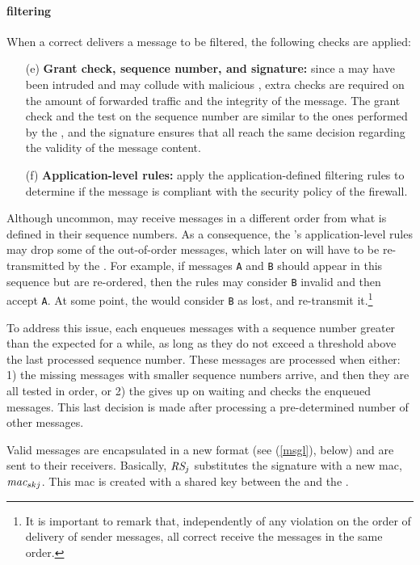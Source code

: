 \paragraph{\Repsieve filtering}
When a correct \repsieve delivers a message to be filtered, the following checks are applied:

\begin{enumerate}
\item[(e)] \textbf{Grant check, sequence number, and signature:} since a \presieve may have been intruded and may collude with malicious \sender, extra checks are required on the amount of forwarded traffic and the integrity of the message.
The grant check and the test on the sequence number are similar to the ones performed by the \presieve, and the signature ensures that all \repsieves reach the same decision regarding the validity of the message content.
\item[(f)] \textbf{Application-level rules:} apply the application-defined filtering rules to determine if the message is compliant with the security policy of the firewall.
\end{enumerate}

Although uncommon, \repsieves may receive messages in a different order from what is defined in their sequence numbers.
As a consequence, the \repsieve's application-level rules may drop some of the out-of-order messages, which later on will have to be re-transmitted by the \sender.
For example, if messages \texttt{A} and \texttt{B} should appear in this sequence but are re-ordered, then the rules may consider \texttt{B} invalid and then accept \texttt{A}.
At some point, the \sender would consider \texttt{B} as lost, and re-transmit it.\footnote{It is important to remark that, independently of any violation on the order of delivery of sender messages, all correct \repsieves receive the messages in the same order.}

To address this issue, each \repsieve enqueues messages with a sequence number greater than the expected for a while, as long as they do not exceed a threshold above the last processed sequence number. These messages are processed when either: 1) the missing messages with smaller sequence numbers arrive, and then they are all tested in order, or 2) the \repsieve gives up on waiting and checks the enqueued messages. This last decision is made after processing a pre-determined number of other messages.

Valid messages are encapsulated in a new format (see (\ref{msgl}), below) and are sent to their receivers.
Basically, \repsieve $\emph{RS}_j$ substitutes the signature with a new \gls{mac}, $\emph{mac}_{skj}$.
This \gls{mac} is created with a shared key between the \repsieve and the \postsieve.


